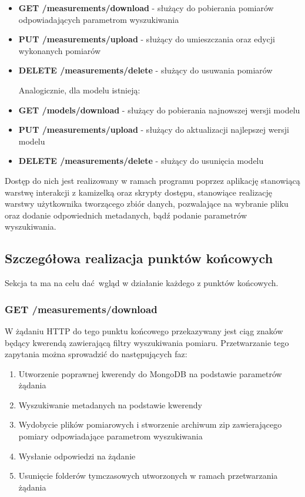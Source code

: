 	\begin{itemize}
		\item{\textbf{GET /measurements/download} - służący do pobierania pomiarów odpowiadających parametrom wyszukiwania}
		\item{\textbf{PUT /measurements/upload} - służący do umieszczania oraz edycji wykonanych pomiarów}
		\item{\textbf{DELETE /measurements/delete} - służący do usuwania pomiarów}
		
		Analogicznie, dla modelu istnieją:
		\item{\textbf{GET /models/download} - służący do pobierania najnowszej wersji modelu}
		\item{\textbf{PUT /measurements/upload} - służący do aktualizacji najlepszej wersji modelu}
		\item{\textbf{DELETE /measurements/delete} - służący do usunięcia modelu}
	\end{itemize}
	
	Dostęp do nich jest realizowany w ramach programu poprzez aplikację stanowiącą warstwę interakcji z kamizelką oraz skrypty dostępu, stanowiące realizację warstwy użytkownika tworzącego zbiór danych, pozwalające na wybranie pliku oraz dodanie odpowiednich metadanych, bądź podanie parametrów wyszukiwania.
	
	\subsection{Szczegółowa realizacja punktów końcowych}
	Sekcja ta ma na celu dać wgląd w działanie każdego z punktów końcowych. 
	\subsubsection{GET /measurements/download}
	W żądaniu HTTP do tego punktu końcowego przekazywany jest ciąg znaków będący kwerendą zawierającą filtry wyszukiwania pomiaru. Przetwarzanie tego zapytania można sprowadzić do następujących faz:
	\begin{enumerate}
		\item {Utworzenie poprawnej kwerendy do MongoDB na podstawie parametrów żądania}
		\item {Wyszukiwanie metadanych na podstawie kwerendy}
		\item {Wydobycie plików pomiarowych i stworzenie archiwum zip zawierającego pomiary odpowiadające parametrom wyszukiwania}
		\item {Wysłanie odpowiedzi na żądanie}
		\item {Usunięcie folderów tymczasowych utworzonych w ramach przetwarzania żądania}
	\end{enumerate}
	

